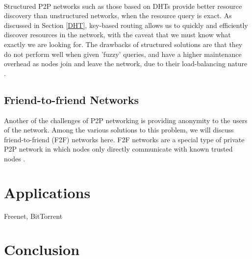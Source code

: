 \documentclass[12pt,letterpaper]{article}
\begin{document}
\paragraph{}
Structured P2P networks such as those based on DHTs provide better resource discovery than unstructured networks, when the resource query is exact.
As discussed in Section \ref{DHT}, key-based routing allows us to quickly and efficiently discover resources in the network, with the caveat that we must know what exactly we are looking for.
The drawbacks of structured solutions are that they do not perform well when given 'fuzzy' queries, and have a higher maintenance overhead as nodes join and leave the network, due to their load-balancing nature \cite{resource}\cite{resource-mobile}.

\subsection{Friend-to-friend Networks}
Another of the challenges of P2P networking is providing anonymity to the users of the network.
Among the various solutions to this problem, we will discuss friend-to-friend (F2F) networks here.
F2F networks are a special type of private P2P network in which nodes only directly communicate with known trusted nodes \cite{wiki-f2f}.


\section{Applications}

Freenet, BitTorrent

\section{Conclusion}



\end{document}
